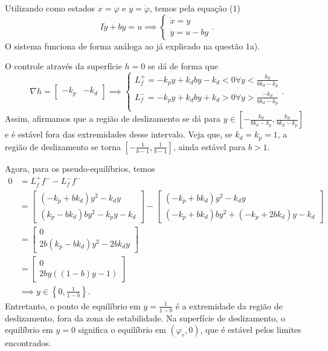 \documentclass[a4paper]{report}
\begin{document}


Utilizando como estados $x = \varphi$ e $y=\dot{\varphi}$, temos pela equação (1) \[
I\dot{y} + by = u \implies \begin{cases}
    \dot{x} = y \\
    \dot{y} = u - by
\end{cases}
.\] O sistema funciona de forma análoga ao já explicado na questão 1a).


O controle através da superfície $h=0$ se dá de forma que \[
    \nabla h = \begin{bmatrix} -k_p & -k_d \end{bmatrix} \implies \begin{cases}
    L_f^{+} = -k_p y +k_d b y -k_d < 0 \forall y < \frac{k_d}{bk_d-k_p} \\
    L_f^{-} = -k_p y +k_d b y +k_d > 0 \forall y > \frac{-k_d}{bk_d-k_p} \\
\end{cases}
.\] Assim, afirmamos que a região de deslizamento se dá para $y \in \left[ -\frac{k_d}{b k_d-k_p}, \frac{k_d}{b k_d-k_p} \right] $ e é estável fora das extremidades desse intervalo. Veja que, se $k_d = k_p = 1$, a região de deslizamento se torna $\left[ -\frac{1}{b-1}, \frac{1}{b-1} \right] $, ainda estável para $b>1$.

Agora, para os pseudo-equilíbrios, temos
\begin{align*}
    0 &= L_f^{+}f^{-} - L_f^{-}f^{-} \\
    &= \begin{bmatrix} 
	(-k_p +b k_d ) y^2 -k_d y  \\
	(k_p -b k_d ) by^2 -k_p y - k_d
    \end{bmatrix} - \begin{bmatrix} 
	(-k_p +b k_d ) y^2 -k_d y  \\
	(-k_p +b k_d ) by^2 +(-k_p +2bk_d) y - k_d
    \end{bmatrix} \\
    &= \begin{bmatrix} 
	0 \\
	2b\left( k_p -bk_d \right) y^2 -2bk_d y
    \end{bmatrix} \tag{*} \\
    &= \begin{bmatrix} 
	0 \\
	2b y\left( \left( 1-b \right) y -1 \right) 
    \end{bmatrix} \\
    &\implies y \in \left\{  0, \frac{1}{1-b}\right\} 
.\end{align*}
Entretanto, o ponto de equilíbrio em $y= \frac{1}{1-b}$ é a extremidade da região de deslizamento, fora da zona de estabilidade. Na superfície de deslizamento, o equilíbrio em $y=0$ significa o equilíbrio em $(\varphi_r,0)$, que é estável pelos limites encontrados.
\end{document}
